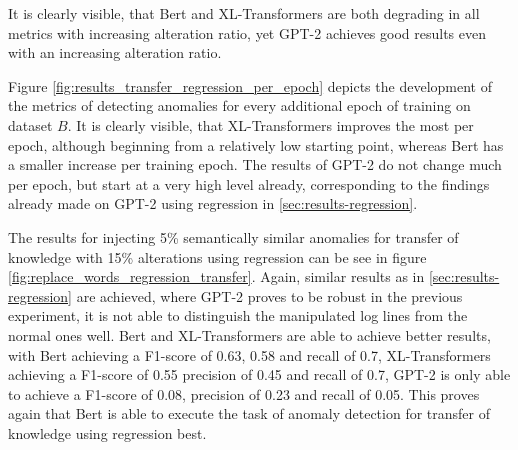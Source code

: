 It is clearly visible, that Bert and XL-Transformers are both degrading in all metrics with increasing alteration ratio, yet GPT-2 achieves good results even with an increasing alteration ratio.

Figure \ref{fig:results_transfer_regression_per_epoch} depicts the development of the metrics of detecting anomalies for every additional epoch of training on dataset $B$. It is clearly visible, that XL-Transformers improves the most per epoch, although beginning from a relatively low starting point, whereas Bert has a smaller increase per training epoch. The results of GPT-2 do not change much per epoch, but start at a very high level already, corresponding to the findings already made on GPT-2 using regression in \ref{sec:results-regression}.

The results for injecting 5\% semantically similar anomalies for transfer of knowledge with 15\% alterations using regression can be see in figure \ref{fig:replace_words_regression_transfer}. Again, similar results as in \ref{sec:results-regression} are achieved, where GPT-2 proves to be robust in the previous experiment, it is not able to distinguish the manipulated log lines from the normal ones well. Bert and XL-Transformers are able to achieve better results, with Bert achieving a F1-score of 0.63, 0.58 and recall of 0.7, XL-Transformers achieving a F1-score of 0.55 precision of 0.45 and recall of 0.7, GPT-2 is only able to achieve a F1-score of 0.08, precision of 0.23 and recall of 0.05. This proves again that Bert is able to execute the task of anomaly detection for transfer of knowledge using regression best.

\begin{comment}
\begin{figure}[h]
  \centering
  \texttt{[image: results/transfer/transfer\_regression\_reverse.png]}\\
  \caption{Scores for detecting reversed order of log events for transfer learning, using regression.}
  \label{fig:regression_transfer_reverse}
\end{figure}
\end{comment}

